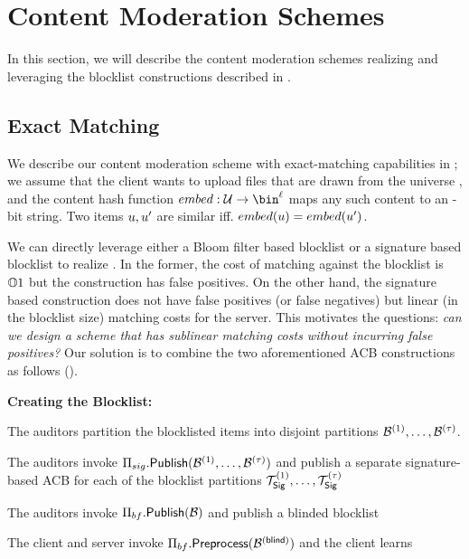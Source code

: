 \section{Content Moderation Schemes}
%
In this section, we will describe the content moderation schemes realizing \contentModFuncExact and \contentModFuncFuzzy leveraging the blocklist constructions described in \secref{}. 


\subsection{Exact Matching}
%
We describe our content moderation scheme with exact-matching capabilities in ; we assume that the client wants to upload files that are drawn from the universe \universe, and the content hash function $\contentHash: \universe \rightarrow \bin^{\genericVecLen}$ maps any such content to an \genericVecLen-bit string. Two items $u, u'$ are similar iff. $\contentHash(\genericUniverseElmt) = \contentHash(\genericUniverseElmtAlt)$.  


%
We can directly leverage either a Bloom filter based blocklist or a signature based blocklist to realize \contentModFuncExact. In the former, the cost of matching against the blocklist is $\mathbb{O}{1}$ but the construction has false positives. On the other hand, the signature based construction does not have false positives (or false negatives) but linear (in the blocklist size) matching costs for the server. This motivates the questions: \emph{can we design a scheme that has sublinear matching costs without incurring false positives?} Our solution is to combine the two aforementioned ACB constructions as follows (). 


\noindent\textbf{Creating the Blocklist:}
\enumListStart
\item The auditors partition the blocklisted items into \numBlocklistParts disjoint partitions $\blocklistPartition{1}, \dots, \blocklistPartition{\numBlocklistParts}$. 
\item The auditors invoke $\sigACB.\publishList(\blocklistPartition{1}, \dots, \blocklistPartition{\numBlocklistParts})$ and publish a separate signature-based ACB for each of the blocklist partitions $\sigBlklistToken{1}, \dots, \sigBlklistToken{\numBlocklistParts}$ 
\item The auditors invoke $\bfACB.\publishList(\blocklist)$ and publish a blinded blocklist \blindedBlocklist
\item The client and server invoke $\bfACB.\preprocess(\blindedBlocklist)$ and the client learns \bfBlklistToken
\enumListEnd

